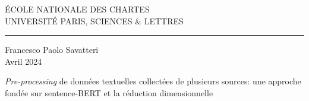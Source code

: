 
		\begin{center}
			
			\bigskip
			
			\begin{large}				
				ÉCOLE NATIONALE DES CHARTES\\
				UNIVERSITÉ PARIS, SCIENCES \& LETTRES
			\end{large}
			\begin{center}\rule{2cm}{0.02cm}\end{center}
			
			\bigskip
			\bigskip
			\bigskip
			\begin{large}
				Francesco Paolo Savatteri\\
				\vspace{1.3\baselineskip}
				Avril 2024
			\end{large}
			
			\vspace{8\baselineskip}
			
		\begin{Large}
				\emph{Pre-processing} de données textuelles collectées de plusieurs sources: une approche fondée sur sentence-BERT et la réduction dimensionnelle
		\end{Large}
	
	
	
			\vfill
			
			
		\end{center}

	
	\thispagestyle{empty}	
	\cleardoublepage